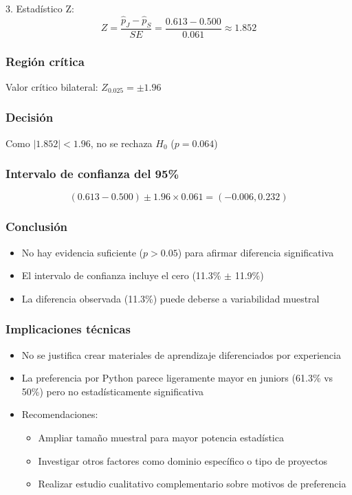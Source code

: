 3. Estadístico Z:
\[
Z = \frac{\hat{p}_J - \hat{p}_S}{SE} = \frac{0.613 - 0.500}{0.061} \approx 1.852
\]

\subsubsection*{Región crítica}
Valor crítico bilateral: $Z_{0.025} = \pm 1.96$

\subsubsection*{Decisión}
Como $|1.852| < 1.96$, no se rechaza $H_0$ ($p = 0.064$)

\subsubsection*{Intervalo de confianza del 95\%}
\[
(0.613 - 0.500) \pm 1.96 \times 0.061 = (-0.006, 0.232)
\]

\subsubsection*{Conclusión}
\begin{itemize}
\item No hay evidencia suficiente ($p > 0.05$) para afirmar diferencia significativa
\item El intervalo de confianza incluye el cero (11.3\% $\pm$ 11.9\%)
\item La diferencia observada (11.3\%) puede deberse a variabilidad muestral
\end{itemize}

\subsubsection*{Implicaciones técnicas}
\begin{itemize}
\item No se justifica crear materiales de aprendizaje diferenciados por experiencia
\item La preferencia por Python parece ligeramente mayor en juniors (61.3\% vs 50\%) pero no estadísticamente significativa
\item Recomendaciones:
\begin{itemize}
\item Ampliar tamaño muestral para mayor potencia estadística
\item Investigar otros factores como dominio específico o tipo de proyectos
\item Realizar estudio cualitativo complementario sobre motivos de preferencia
\end{itemize}
\end{itemize}

